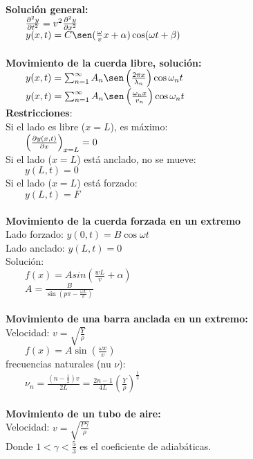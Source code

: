 \documentclass[a4paper,landscape,10pt]{cheatsheet}
\begin{document}
\hfill\\
\textbf{Solución general:} \\
$\qquad\pdv[2]{y}{t}=v^2\pdv[2]{y}{x}$\\
$\qquad y(x,t)=C\sen(\frac{\omega}{v}x+\alpha)\cos(\omega t+\beta)$\\

\hfill\\
\textbf{Movimiento de la cuerda libre, solución:}
$\qquad y(x,t)=\sum_{n=1}^{\infty} A_n\sen\left(\frac{2\pi x}{\lambda_n}\right)\cos \omega_nt$ \\
$\qquad y(x,t)=\sum_{n=1}^{\infty} A_n\sen\left(\frac{\omega_n x}{v_n}\right)\cos \omega_nt$\\
\textbf{Restricciones}:\\
Si el lado es libre ($x=L$), es máximo: \\
$\qquad \left(\pdv{y(x,t)}{x}\right)_{x=L}=0$\\
Si el lado ($x=L$) está anclado, no se mueve:\\
$\qquad y(L,t)=0$\\
Si el lado ($x=L$) está forzado:\\
$\qquad y(L,t)=F$\\

\hfill\\
\textbf{Movimiento de la cuerda forzada en un extremo}\\
Lado forzado: $y(0,t) = B\cos\omega t$\\
Lado anclado: $y(L,t) = 0$\\
Solución:\\
$\qquad f(x)=Asin\left(\frac{wL}{v}+\alpha\right)$\\
$\qquad A=\frac{B}{\sin\left(p\pi-\frac{\omega L}{v}\right)}$\\

\hfill\\
\textbf{Movimiento de una barra anclada en un extremo:}\\
Velocidad: $v=\sqrt{\frac{Y}{\rho}}$\\
$\qquad f(x)=A\sin\left(\frac{\omega x}{v}\right)$\\

frecuencias naturales (nu $\nu$):\\
$\qquad \nu_n=\frac{\left(n-\frac{1}{2}\right)v}{2L}=\frac{2n-1}{4L}\left(\frac{Y}{\rho}\right)^{\frac{1}{2}}$\\

\hfill\\
\textbf{Movimiento de un tubo de aire:}\\
Velocidad: $v=\sqrt{\frac{P\gamma}{\rho}}$\\
Donde $1<\gamma<\frac{5}{3}$ es el coeficiente de adiabáticas.\\
\end{document}
